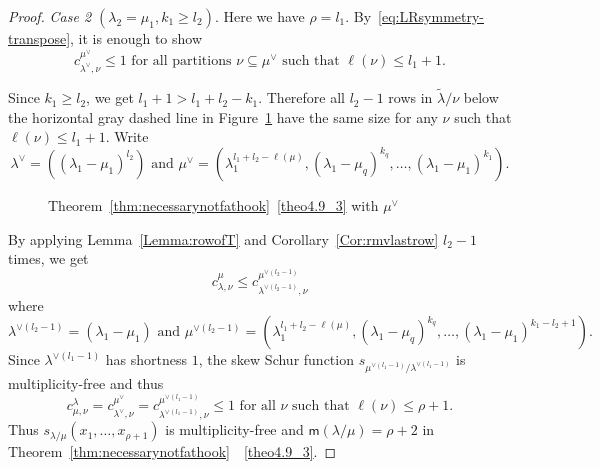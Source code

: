 \documentclass[10pt]{article}
\theoremstyle{definition}
\newcommand{\msf}{\mathsf{m}}
\DeclareMathOperator{\rotate}{rotate}
\newenvironment{Case}[1]{\par\vskip2pt\noindent%
\emph{#1}.}{\vskip2pt}
\begin{document}
\begin{proof}
\begin{Case}
{Case 2 $(\lambda_2 = \mu_1, k_1\geq l_2)$} 
Here we have $\rho = l_1$. By~\eqref{eq:LRsymmetry-transpose}, it is enough to show
\[
c^{\mu^\vee}_{\lambda^\vee,\nu}\leq 1\text{ for all partitions }\nu\subseteq \mu^\vee \text{ such that }\ell(\nu)\leq l_1+1.
\]


Since $k_1\geq l_2$, we get $l_1+1 > l_1+l_2-k_1$. Therefore all $l_2-1$ rows in $\tilde\lambda/\nu$ below the horizontal gray dashed line in Figure~\ref{case2anecessary} have the same size for any $\nu$ such that $\ell(\nu)\leq l_1+1$. 
Write
\[
\lambda^\vee = ((\lambda_1-\mu_1)^{l_2})\text{ and }\mu^\vee = (\lambda_1^{l_1+l_2-\ell(\mu)},(\lambda_1-\mu_q)^{k_q},\ldots,(\lambda_1-\mu_1)^{k_1}).
\]

\begin{figure}[htb]\centering
 \caption{Theorem~\ref{thm:necessarynotfathook}~\ref{theo4.9_3} with $\mu^\vee$}
 \label{case2anecessary} 

\end{figure}

\noindent
By applying Lemma~\ref{Lemma:rowofT} and Corollary~\ref{Cor:rmvlastrow} $l_2-1$ times, we get
\[
c^{\mu}_{\lambda,\nu} \leq c^{\mu^{\vee(l_2-1)}}_{\lambda^{\vee(l_2-1)},\nu}
\]
where
\[
\lambda^{\vee(l_2-1)} = (\lambda_1-\mu_1)\text{ and }\mu^{\vee(l_2-1)} = (\lambda_1^{l_1+l_2-\ell(\mu)},(\lambda_1-\mu_q)^{k_q},\ldots,(\lambda_1-\mu_1)^{k_1-l_2+1}).
\]
Since $\lambda^{\vee(l_1-1)}$ has shortness $1$, the skew Schur function $s_{\mu^{\vee(l_1-1)}/\lambda^{\vee(l_1-1)}}$ is multiplicity-free and thus 
\[
c^{\lambda}_{\mu,\nu} = c^{\mu^\vee}_{\lambda^\vee,\nu} = c^{\mu^{\vee(l_1-1)}}_{\lambda^{\vee(l_1-1)},\nu} \leq 1\text{ for all }\nu\text{ such that }\ell(\nu)\leq \rho+1.
\]
Thus $s_{\lambda/\mu}(x_1,\ldots,x_{\rho+1})$ is multiplicity-free and ${\msf }(\lambda/\mu) = \rho+2$ in Theorem~\ref{thm:necessarynotfathook}~~\ref{theo4.9_3}.\qedhere
\end{Case}



\end{proof}
\end{document}
